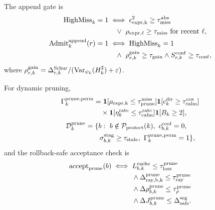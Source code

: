 \documentclass[
  reprint,
  amsmath,
  amssymb,
  aps,
  pra,
  nofootinbib,
  superscriptaddress,
  floatfix
]{revtex4-2}
\newcommand{\Pcal}{\mathcal{P}}
\newcommand{\Dcal}{\mathcal{D}}
\newcommand{\app}{\mathrm{append}}
\newcommand{\prune}{\mathrm{prune}}
\newcommand{\Var}{\operatorname{Var}}
\newcommand{\eps}{\varepsilon}
\begin{document}
The append gate is
\begin{equation}
\begin{aligned}
\operatorname{HighMiss}_k=1
&\iff \epsilon_{\rm expr,k}^2\ge\tau_{\rm miss}^{\rm abs}\\
&\quad\vee\ \rho_{\rm expr,\ell}\ge\tau_{\rm miss}
\ \text{for recent } \ell,\\
\operatorname{Admit}_k^{\app}(r)=1
&\iff \operatorname{HighMiss}_k=1\\
&\quad\wedge\ \rho_{r,k}^{\rm gain}\ge\tau_{\rm gain}
\wedge S_{r,k}^{\rm conf}\ge\tau_{\rm conf},
\end{aligned}
\label{eq:append_admit}
\end{equation}
where $\rho_{r,k}^{\rm gain}=\Delta_{r,k}^{\rm Schur}/(\Var_{\psi_k}(H_k^\sharp)+\eps)$.

For dynamic pruning,
\begin{equation}
\begin{aligned}
\Gamma_k^{\prune,\rm perm}
&=\mathbf 1[\rho_{\rm expr,k}\le\tau_{\prune}^{\rm miss}]
\mathbf 1[c_k^{\rm dir}\ge\tau_{\rm calm}^{\cos}]\\
&\quad\times
\mathbf 1[\eta_k^{\rm rate}\le\tau_{\rm calm}^{\rm rate}]
\mathbf 1[B_k\ge2],
\end{aligned}
\label{eq:prune_perm}
\end{equation}
\begin{equation}
\begin{aligned}
\Dcal_k^{\prune}
&=\{b:\ b\notin\Pcal_{\rm protect}(k),\ c_{b,k}^{\rm cool}=0,\\
&\qquad
\sigma_{b,k}^{\rm stag}\ge\tau_{\rm stale},\
\Gamma_k^{\prune,\rm perm}=1\},
\end{aligned}
\label{eq:dyn_prune_candidates}
\end{equation}
and the rollback-safe acceptance check is
\begin{equation}
\begin{aligned}
\operatorname{accept}_{\prune}(b)\iff{}&
L_{b,k}^{\rm cache}\le\tau_{\rm loss}^{\prune}\\
&\wedge\Delta_{\rm ray,b,k}^{\prune}\le\tau_{\rm ray}^{\prune}\\
&\wedge\Delta\rho_{b,k}^{\prune}\le\tau_{\rho}^{\prune}\\
&\wedge\Delta J_{b,k}^{\prune}\le\Delta_{\rm safe}^{\rm seg}.
\end{aligned}
\label{eq:dyn_prune_accept}
\end{equation}
\end{document}
